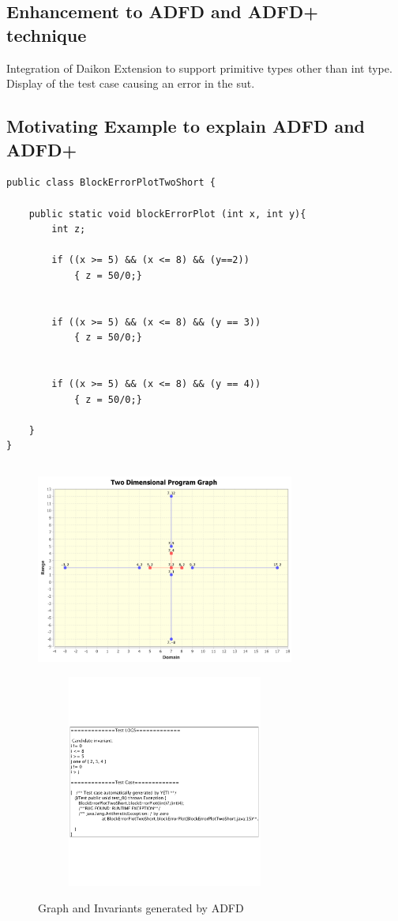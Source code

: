 \documentclass[conference]{IEEEtran}
\begin{document}
\subsection{Enhancement to ADFD and ADFD+ technique}

Integration of Daikon
Extension to support primitive types other than int type.
Display of the test case causing an error in the sut.


\subsection{Motivating Example to explain ADFD and ADFD+}

\begin{lstlisting}
public class BlockErrorPlotTwoShort {

	public static void blockErrorPlot (int x, int y){
		int z;

		if ((x >= 5) && (x <= 8) && (y==2))
			{ z = 50/0;}


		if ((x >= 5) && (x <= 8) && (y == 3))
			{ z = 50/0;}


		if ((x >= 5) && (x <= 8) && (y == 4))
			{ z = 50/0;}

	}
}
\end{lstlisting}


\begin{figure}[ht]
\centering
\includegraphics[width= 8.5cm,height=7cm]{adfdGraph.png}
\includegraphics[width= 8.5cm,height=7cm]{adfdInvariants.png}
\caption{Graph and Invariants generated by ADFD}
\label{fig:ADFD+}
\end{figure}
\end{document}
